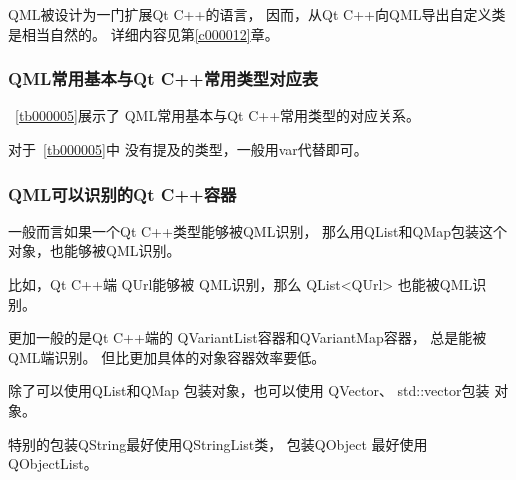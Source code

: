 QML被设计为一门扩展Qt C{\sourcefonttwo{}+}{\sourcefonttwo{}+}的语言，
因而，从Qt C{\sourcefonttwo{}+}{\sourcefonttwo{}+}向QML导出自定义类是相当自然的。
详细内容见第\ref{c000012}章。

\FloatBarrier
\subsubsection{
QML常用基本与Qt C{\sourcefonttwo{}+}{\sourcefonttwo{}+}常用类型对应表
}\label{c000011s000000s01s04}


\tablename\ \ref{tb000005}展示了
QML常用基本与Qt C{\sourcefonttwo{}+}{\sourcefonttwo{}+}常用类型的对应关系。



对于\tablename\ \ref{tb000005}中
没有提及的类型，一般用var代替即可。

\FloatBarrier
\subsubsection{
QML可以识别的Qt C{\sourcefonttwo{}+}{\sourcefonttwo{}+}容器
}\label{c000011s000000s01s05}


一般而言如果一个Qt C{\sourcefonttwo{}+}{\sourcefonttwo{}+}类型能够被QML识别，
那么用QList和QMap包装这个对象，也能够被QML识别。

比如，Qt C{\sourcefonttwo{}+}{\sourcefonttwo{}+}端
QUrl能够被
QML识别，那么
QList<QUrl>
也能被QML识别。

更加一般的是Qt C{\sourcefonttwo{}+}{\sourcefonttwo{}+}端的
QVariantList容器和QVariantMap容器，
总是能被QML端识别。
但比更加具体的对象容器效率要低。

除了可以使用QList和QMap
包装对象，也可以使用
QVector、
std::vector包装
对象。

特别的包装QString最好使用QStringList类，
包装QObject \raisebox{-0.35ex}{\sourcefonttwo{}*}最好使用QObjectList。












